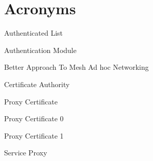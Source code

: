 \chapter*{Acronyms}

\begin{acronym}


 {Authenticated List}

 {Authentication Module}

 {Better Approach To Mesh Ad hoc Networking}

 {Certificate Authority}













 {Proxy Certificate}

 {Proxy Certificate 0}

 {Proxy Certificate 1}





 {Service Proxy}


%

\end{acronym}
